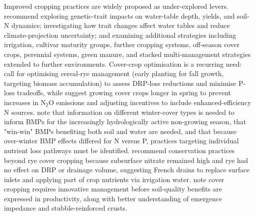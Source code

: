 Improved cropping practices are widely proposed as under-explored levers. \textcite{Elli2023} recommend exploring genetic-trait impacts on water-table depth, yields, and soil-N dynamics; investigating how trait changes affect water tables and reduce climate-projection uncertainty; and examining additional strategies including irrigation, cultivar maturity groups, further cropping systems, off-season cover crops, perennial systems, green manure, and stacked multi-management strategies extended to further environments. Cover-crop optimisation is a recurring need: \textcite{deOliveira2022} call for optimising cereal-rye management (early planting for fall growth, targeting biomass accumulation) to assess DRP-loss reductions and minimise P-loss tradeoffs, while \textcite{PrezaFontes2023} suggest growing cover crops longer in spring to prevent increases in N$_2$O emissions and adjusting incentives to include enhanced-efficiency N sources. \textcite{McNeill2026} note that information on different winter-cover types is needed to inform BMPs for the increasingly hydrologically active non-growing season, that "win-win" BMPs benefiting both soil and water are needed, and that because over-winter BMP effects differed for N versus P, practices targeting individual nutrient loss pathways must be identified. \textcite{Krueger2013} recommend conservation practices beyond rye cover cropping because subsurface nitrate remained high and rye had no effect on DRP or drainage volume, suggesting French drains to replace surface inlets and applying part of crop nutrients via irrigation water. \textcite{Mitchell2000} note cover cropping requires innovative management before soil-quality benefits are expressed in productivity, along with better understanding of emergence impedance and stubble-reinforced crusts.

